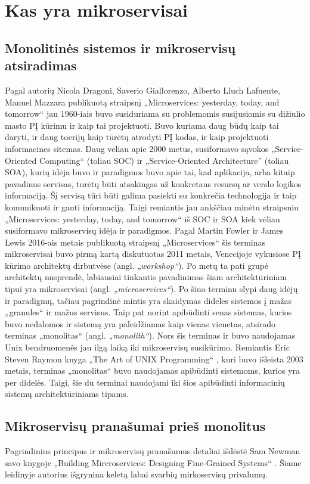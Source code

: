\section{Kas yra mikroservisai}

\subsection{Monolitinės sistemos ir mikroservisų atsiradimas}
Pagal autorių Nicola Dragoni, Saverio Giallorenzo, Alberto Lluch Lafuente, Manuel Mazzara publikuotą straipsnį „Microservices: yesterday, today, and tomorrow“
\cite{Misc7} jau 1960-iais buvo susiduriama su problemomis susijusiomis su dižiulio masto PĮ kūrimu ir kaip tai projektuoti.
Buvo kuriama daug būdų kaip tai daryti, ir daug toerijų kaip tūrėtų atrodyti PĮ kodas, ir kaip projektuoti informacines sitemas.
Daug veliau apie 2000 metus, susiformavo sąvokos „Service-Oriented Computing“ (toliau SOC) ir „Service-Oriented Architecture” (toliau SOA), kurių idėja buvo ir paradigmos buvo apie
tai, kad aplikacija, arba kitaip pavadinus servisas, turėtų būti atsakingas už konkretaus resursų ar verslo logikos informaciją.
Šį servisą tūri būti galima pasiekti su konkrečia technologija ir taip komunikuoti ir gauti informaciją. 
Taigi remiantis jau ankščiau minėtu straipsniu „Microservices: yesterday, today, and tomorrow“ \cite{Mis7} iš SOC ir SOA kiek vėliau susiformavo
mikroservisų idėja ir paradigmos. Pagal Martin Fowler ir James Lewis 2016-ais metais publikuotą straipsnį „Microservices“ \cite{Misc6}
šis terminas mikroservisai buvo pirmą kartą diskutuotas 2011 metais, Venecijoje vykusiose PĮ kūrimo architektų
dirbutvėse (angl. \textit{„workshop“}). Po metų ta pati grupė architektų nusprendė, labiausiai tinkantis pavadinimas
šiam architektūriniam tipui yra mikroservisai (angl. \textit{„microservices“}). Po šiuo terminu slypi daug idėjų ir paradigmų,
tačiau pagrindinė mintis yra skaidymas dideles sistemos į mažas „granules“ ir mažus servisus.
Taip pat norint apibūdinti senas sistemas, kurios buvo nedalomos ir sistemą yra paleidžiamas kaip vienas vienetas, atsirado terminas „monolitas“ (angl. \textit{„monolith“}).
Nors šis terminas ir buvo naudojamas Unix bendruomenės jau ilgą laiką iki mikroservisų susikūrimo.
Remiantis Eric Steven Raymon knyga „The Art of UNIX Programming“ \cite{Bk4}, kuri buvo išleista 2003 metais,
terminas „monolitas“ buvo naudojamas apibūdinti sistemoms, kurios yra per didelės. Taigi, šie du terminai
naudojami iki šios apibūdinti informacinių sistemų architektūriniams tipams.
\subsection{Mikroservisų pranašumai prieš monolitus}
Pagrindinius principus ir mikroservisų pranašumus detaliai išdėstė Sam Newman savo knygoje „Building Mircroservices: Designing Fine-Grained Systems“ \cite{Bk2}.
Šiame leidinyje autorius išgrynina keletą labai svarbių mirkoservisų privalumų.
